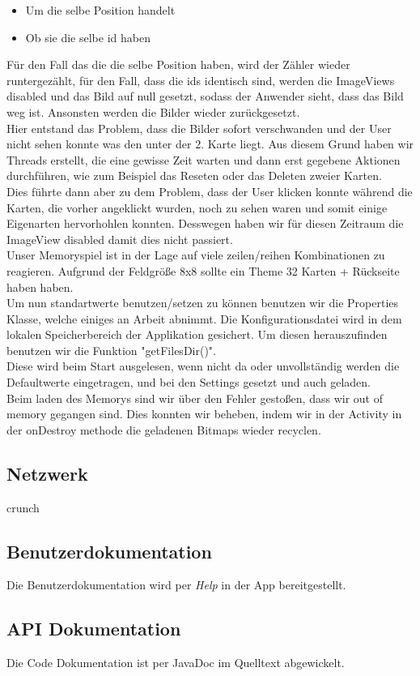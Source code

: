 \documentclass[11pt,a4paper]{article}
\begin{document}
\begin{itemize}
	\item Um die selbe Position handelt 
	\item Ob sie die selbe id haben
\end{itemize}
	
Für den Fall das die die selbe Position haben, wird der Zähler wieder runtergezählt, für den Fall, dass die ids identisch sind, werden die ImageViews disabled und das Bild auf null gesetzt, sodass der Anwender sieht, dass das Bild weg ist. Ansonsten werden die Bilder wieder zurückgesetzt. \\

Hier entstand das Problem, dass die Bilder sofort verschwanden und der User nicht sehen konnte was den unter der 2. Karte liegt. Aus diesem Grund haben wir Threads erstellt, die eine gewisse Zeit warten und dann erst gegebene Aktionen durchführen, wie zum Beispiel das Reseten oder das Deleten zweier Karten. \\

Dies führte dann aber zu dem Problem, dass der User klicken konnte während die Karten, die vorher angeklickt wurden, noch zu sehen waren und somit einige Eigenarten hervorhohlen konnten. Desswegen haben wir für diesen Zeitraum die ImageView disabled damit dies nicht passiert.\\

Unser Memoryspiel ist in der Lage auf viele zeilen/reihen 
Kombinationen zu reagieren. Aufgrund der Feldgröße 8x8 sollte ein 
Theme 32 Karten + Rückseite haben haben.  \\

Um nun standartwerte benutzen/setzen zu können benutzen wir die Properties Klasse, welche einiges an Arbeit abnimmt. Die Konfigurationsdatei wird in dem lokalen Speicherbereich der Applikation gesichert. Um diesen herauszufinden benutzen wir die Funktion "getFilesDir()". \\

Diese wird beim Start ausgelesen, wenn nicht da oder unvollständig werden die Defaultwerte eingetragen, und bei den Settings gesetzt und auch geladen. \\

Beim laden des Memorys sind wir über den Fehler gestoßen, dass wir out of memory gegangen sind. Dies konnten wir beheben, indem wir in der Activity in der onDestroy methode die geladenen  Bitmaps wieder recyclen. \\

\subsection{Netzwerk}
crunch

\subsection*{Benutzerdokumentation}

Die Benutzerdokumentation wird per {\em Help} in der App bereitgestellt. 

\subsection*{API Dokumentation}

Die Code Dokumentation ist per JavaDoc im Quelltext abgewickelt.
\end{document}
